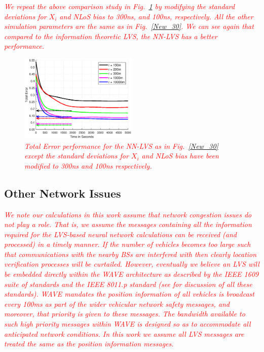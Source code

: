 \documentclass[journal]{IEEEtran}
\begin{document}
\textcolor{red}{\textit{We repeat the above comparison study in Fig.~\ref{New_31} by modifying the standard deviations for $X_i$ and NLoS bias to 300ns, and 100ns, respectively. All the other simulation parameters are the same as in Fig.~\ref{New_30}. We can see again that compared to the information theoretic LVS, the NN-LVS has a better performance.}}
\begin{figure}[t!]
\includegraphics[width=0.50\textwidth]{final-T300-N100-V4-arrow.eps}
\caption{\textcolor{red}{\textit{Total Error performance for the NN-LVS as in Fig.~\ref{New_30} except the standard deviations for $X_i$ and NLoS bias have been modified to 300ns and 100ns respectively.}}\label{New_31}}
\end{figure}

\subsection{Other Network Issues}
\textcolor{red}{\textit{We note our calculations in this work assume that network congestion issues do not play a role. That is, we assume the messages containing all the information required for the LVS-based neural network calculations can be received  (and processed) in a timely manner. If the number of vehicles becomes too large such that communications with the nearby BSs are interfered with then clearly location verification processes will be curtailed. However, eventually we believe an LVS will be embedded directly within the WAVE architecture as described by the IEEE 1609 suite of standards and the IEEE 8011.p standard (see \cite{meneguetteintelligent} for discussion of all these standards). WAVE mandates the position information of all vehicles is broadcast every 100ms as part of the wider vehicular network safety messages, and moreover, that priority is given to these messages. The bandwidth available to such high priority messages within WAVE is designed so as to accommodate all anticipated network conditions. In this work we assume all LVS messages are treated the same as the position information messages.}}
\end{document}
